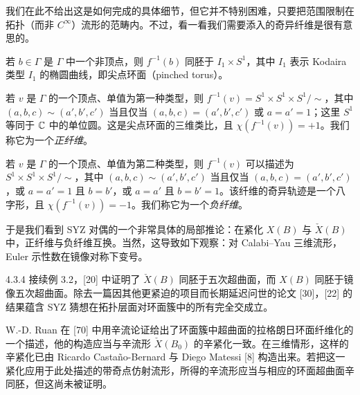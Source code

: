 我们在此不给出这是如何完成的具体细节，但它并不特别困难，只要把范围限制在拓扑（而非 $C^\infty$）流形的范畴内。不过，看一看我们需要添入的奇异纤维是很有意思的。

若 $b\in\Gamma$ 是 $\Gamma$ 中一个非顶点，则 $f^{-1}(b)$ 同胚于 $I_1\times S^1$，其中 $I_1$ 表示 Kodaira 类型 $I_1$ 的椭圆曲线，即尖点环面（pinched torus）。

若 $v$ 是 $\Gamma$ 的一个顶点、单值为第一种类型，则 $f^{-1}(v)=S^1\times S^1\times S^1/{\sim}$，其中 $(a,b,c)\sim(a',b',c')$ 当且仅当 $(a,b,c)=(a',b',c')$ 或 $a=a'=1$；这里 $S^1$ 等同于 $\mathbb{C}$ 中的单位圆。这是尖点环面的三维类比，且 $\chi(f^{-1}(v))=+1$。我们称它为一个\emph{正纤维}。

若 $v$ 是 $\Gamma$ 的一个顶点、单值为第二种类型，则 $f^{-1}(v)$ 可以描述为 $S^1\times S^1\times S^1/{\sim}$，其中 $(a,b,c)\sim(a',b',c')$ 当且仅当 $(a,b,c)=(a',b',c')$，或 $a=a'=1$ 且 $b=b'$，或 $a=a'$ 且 $b=b'=1$。该纤维的奇异轨迹是一个八字形，且 $\chi(f^{-1}(v))=-1$。我们称它为一个\emph{负纤维}。

于是我们看到 SYZ 对偶的一个非常具体的局部推论：在紧化 $X(B)$ 与 $\check X(B)$ 中，正纤维与负纤维互换。当然，这导致如下观察：对 Calabi--Yau 三维流形，Euler 示性数在镜像对称下变号。

\begin{example}{4.3.4}
接续例 3.2，[20] 中证明了 $\check X(B)$ 同胚于五次超曲面，而 $X(B)$ 同胚于镜像五次超曲面。除去一篇因其他更紧迫的项目而长期延迟问世的论文 [30]，[22] 的结果蕴含 SYZ 猜想在拓扑层面对环面簇中的所有完全交成立。
\end{example}

W.-D. Ruan 在 [70] 中用辛流论证给出了环面簇中超曲面的拉格朗日环面纤维化的一个描述，他的构造应当与辛流形 $\check X(B_0)$ 的辛紧化一致。在三维情形，这样的辛紧化已由 Ricardo Castaño-Bernard 与 Diego Matessi [8] 构造出来。若把这一紧化应用于此处描述的带奇点仿射流形，所得的辛流形应当与相应的环面超曲面辛同胚，但这尚未被证明。

